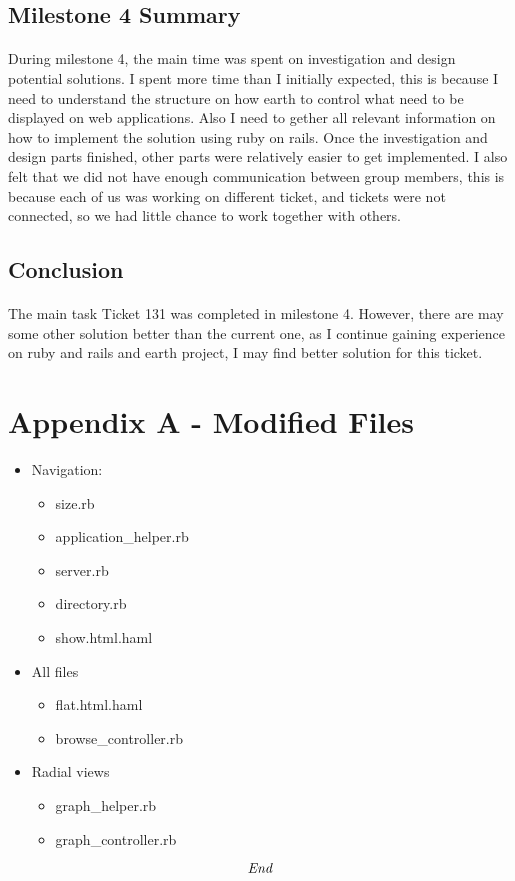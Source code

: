 \documentclass[oneside, 10pt, a4]{article}
\begin{document}
\subsection*{Milestone 4 Summary}

\paragraph{}
During milestone 4, the main time was spent on investigation and design potential solutions. I spent more time than I initially expected, this is because I need to understand the structure on how earth to control what need to be displayed on web applications. Also I need to gether all relevant information on how to implement the solution using ruby on rails. Once the investigation and design parts finished, other parts were relatively easier to get implemented. I also felt that we did not have enough communication between group members, this is because each of us was working on different ticket, and tickets were not connected, so we had little chance to work together with others.

\subsection*{Conclusion}

\paragraph{}
The main task Ticket 131 was completed in milestone 4. However, there are may some other solution better than the current one, as I continue gaining experience on ruby and rails and earth project, I may find better solution for this ticket.

\section*{Appendix A - Modified Files}

\begin{itemize}
 \item Navigation:
	\begin{itemize}
 	\item size.rb
	\item application\_helper.rb
	\item server.rb
	\item directory.rb
	\item show.html.haml
	\end{itemize}
 \item All files
	\begin{itemize}
 	\item flat.html.haml
	\item browse\_controller.rb
	\end{itemize}
\item Radial views
	\begin{itemize}
 	\item graph\_helper.rb
	\item graph\_controller.rb
	\end{itemize}
\end{itemize}

\[\emph{End}\]
\end{document}
